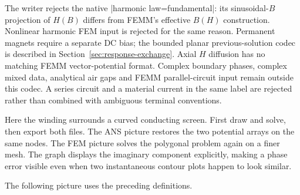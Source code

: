 The writer rejects the native |harmonic law=fundamental|: its sinusoidal-$B$
projection of $H(B)$ differs from FEMM's effective $B(H)$ construction. Nonlinear
harmonic FEM input is rejected for the same reason. Permanent magnets require a
separate DC bias; the bounded planar previous-solution codec is described in
Section~\ref{sec:response-exchange}. Axial $H$ diffusion has no matching
FEMM vector-potential format. Complex boundary phases, complex mixed data,
analytical air gaps and FEMM parallel-circuit input
remain outside this codec. A series circuit and a material current in the same
label are rejected rather than combined with ambiguous terminal conventions.

Here the winding surrounds a curved conducting screen. First draw and solve,
then export both files. The ANS picture restores the two potential arrays on the
same nodes. The FEM picture solves the polygonal problem again on a finer mesh.
The graph displays the imaginary component explicitly, making a phase error
visible even when two instantaneous contour plots happen to look similar.


\begin{codeexample}
\end{codeexample}

The following picture uses the preceding definitions.


\begin{codeexample}[width=5.2cm]
\end{codeexample}

